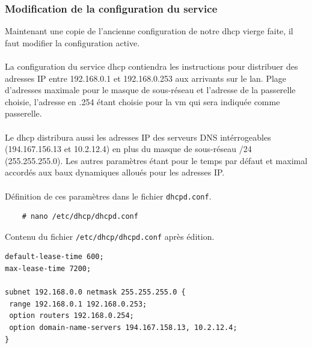 \documentclass[a4paper]{article}
\begin{document}
\subsubsection{Modification de la configuration du service}
Maintenant une copie de l'ancienne configuration de notre \gls{dhcp} vierge faite, il faut modifier la configuration active.\\\\La configuration du service \gls{dhcp} contiendra les instructions pour distribuer des adresses IP entre 192.168.0.1 et 192.168.0.253 aux arrivants sur le \gls{lan}. Plage d'adresses maximale pour le masque de sous-réseau et l'adresse de la passerelle  choisie, l'adresse en .254 étant choisie pour la \acrshort{vm} qui sera indiquée comme passerelle.\\\\Le \gls{dhcp} distribura aussi les adresses IP des serveurs DNS intérrogeables (194.167.156.13 et 10.2.12.4) en plus du masque de sous-réseau /24 (255.255.255.0). Les autres paramètres étant pour le temps par défaut et maximal accordés aux baux dynamiques alloués pour les adresses IP.\\\\Définition de ces paramètres dans le fichier \verb|dhcpd.conf|.
\begin{lstlisting}
    # nano /etc/dhcp/dhcpd.conf
\end{lstlisting}
Contenu du fichier \verb|/etc/dhcp/dhcpd.conf| après édition.
\begin{lstlisting}
default-lease-time 600;
max-lease-time 7200;
 
subnet 192.168.0.0 netmask 255.255.255.0 {
 range 192.168.0.1 192.168.0.253;
 option routers 192.168.0.254;
 option domain-name-servers 194.167.158.13, 10.2.12.4;
}
\end{lstlisting}
\end{document}

